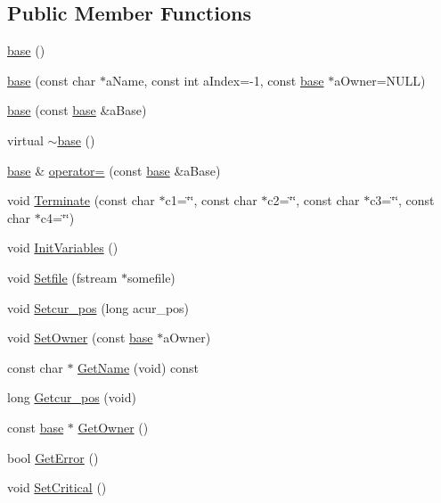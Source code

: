 \subsection*{Public Member Functions}
\begin{DoxyCompactItemize}
\item 
\hyperlink{classbase_a3b0362be8b58605e4975b969dd8131a4}{base} ()
\item 
\hyperlink{classbase_aa3d07f04318c6e353a7ea6652c548540}{base} (const char $\ast$aName, const int aIndex=-\/1, const \hyperlink{classbase}{base} $\ast$aOwner=NULL)
\item 
\hyperlink{classbase_acba16924ff51ea95c2479951a459efb7}{base} (const \hyperlink{classbase}{base} \&aBase)
\item 
virtual \hyperlink{classbase_aab55b674bac3fd0abec406951dbda4eb}{$\sim$base} ()
\item 
\hyperlink{classbase}{base} \& \hyperlink{classbase_abd18e2130f975aacfde1833ad137e3c5}{operator=} (const \hyperlink{classbase}{base} \&aBase)
\item 
void \hyperlink{classbase_a32986c47c1ff0d162befc4a3830734f2}{Terminate} (const char $\ast$c1=\char`\"{}\char`\"{}, const char $\ast$c2=\char`\"{}\char`\"{}, const char $\ast$c3=\char`\"{}\char`\"{}, const char $\ast$c4=\char`\"{}\char`\"{})
\item 
void \hyperlink{classbase_ad2f5f5c9ec517641f63e52646cf49ad9}{InitVariables} ()
\item 
void \hyperlink{classbase_a3cb378050dc4ced8420f41dcd7292239}{Setfile} (fstream $\ast$somefile)
\item 
void \hyperlink{classbase_a95e051f408e6a94d4f78fbacbace1363}{Setcur\_\-pos} (long acur\_\-pos)
\item 
void \hyperlink{classbase_a42c446f0adea294e97a2486946b7cbc4}{SetOwner} (const \hyperlink{classbase}{base} $\ast$aOwner)
\item 
const char $\ast$ \hyperlink{classbase_a5b4079d3eb535e704fcaed3016c76ecb}{GetName} (void) const 
\item 
long \hyperlink{classbase_ab2462023b3d3545dc322beba514ca871}{Getcur\_\-pos} (void)
\item 
const \hyperlink{classbase}{base} $\ast$ \hyperlink{classbase_a9b463ca5ce18a3bec36b17c8a4b66d89}{GetOwner} ()
\item 
bool \hyperlink{classbase_a3bd68866b69ba97fbfc68152fd864408}{GetError} ()
\item 
void \hyperlink{classbase_a80052a7eeb8bce90247aedd358cc1cf6}{SetCritical} ()
\item 

\end{DoxyCompactItemize}
